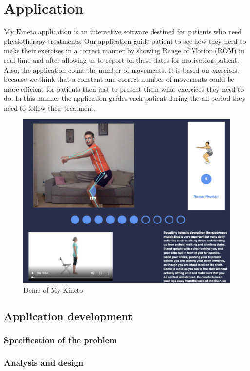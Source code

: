 
\chapter{Application}

\par My Kineto application is an interactive software destined for patients who need physiotherapy treatments. Our application guide patient to see how they need to make their exercises in a correct manner by showing Range of Motion (ROM) in real time and after allowing us to report on these dates for motivation patient. Also, the application count the number of movements. It is based on exercices, because we think that a constant and correct number of movements could be more efficient for patients then just to present them what exercices they need to do. In this manner the application guides each patient during the all period they need to follow their treatment. 
\begin{figure}[htbp]
	\centerline{\includegraphics[scale=0.8]{fig/demo-mykineto.png}}  
	\caption{Demo of My Kineto}
\end{figure}

\section{Application development}
\subsection{Specification of the problem}
\subsection{Analysis and design}
